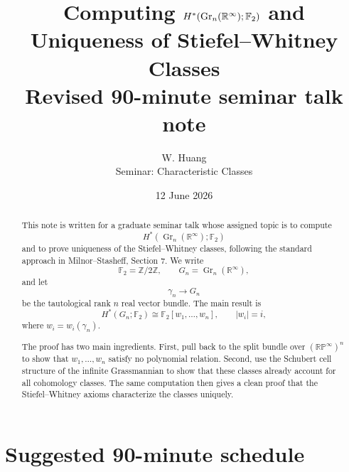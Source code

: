 \documentclass[11pt]{article}
\title{Computing $H^*(\Gr_n(\R^\infty);\F_2)$ and Uniqueness of Stiefel--Whitney Classes\\[0.4em]
\large Revised 90-minute seminar talk note}
\author{W. Huang\\Seminar: Characteristic Classes}
\date{12 June 2026}
\theoremstyle{remark}
\newcommand{\F}{\mathbb F}
\newcommand{\R}{\mathbb R}
\newcommand{\RP}{\mathbb{RP}}
\newcommand{\Gr}{\operatorname{Gr}}
\newcommand{\Gn}{G_n}
\newcommand{\gamman}{\gamma_n}
\begin{document}
\maketitle

\begin{abstract}
This note is written for a graduate seminar talk whose assigned topic is to compute
\[
  H^*(\Gr_n(\R^\infty);\F_2)
\]
and to prove uniqueness of the Stiefel--Whitney classes, following the standard approach in Milnor--Stasheff, Section 7.  We write
\[
  \F_2=\mathbb Z/2\mathbb Z,\qquad \Gn=\Gr_n(\R^\infty),
\]
and let
\[
  \gamman\to \Gn
\]
be the tautological rank $n$ real vector bundle.  The main result is
\[
  H^*(\Gn;\F_2)\cong \F_2[w_1,\dots,w_n],\qquad |w_i|=i,
\]
where $w_i=w_i(\gamman)$.

The proof has two main ingredients.  First, pull back to the split bundle over $(\RP^\infty)^n$ to show that $w_1,\dots,w_n$ satisfy no polynomial relation.  Second, use the Schubert cell structure of the infinite Grassmannian to show that these classes already account for all cohomology classes.  The same computation then gives a clean proof that the Stiefel--Whitney axioms characterize the classes uniquely.
\end{abstract}

\tableofcontents

\section*{Suggested 90-minute schedule}
\end{document}
